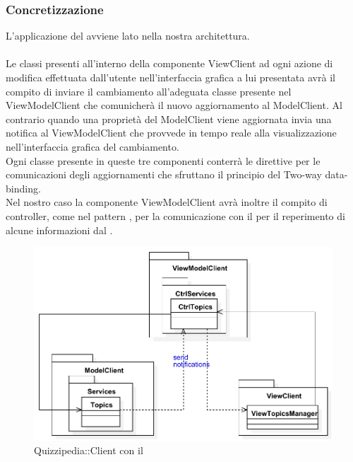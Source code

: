 \documentclass[a4paper, titlepage]{article}
\begin{document}
\subsubsection{Concretizzazione}
L'applicazione del   avviene lato  nella nostra architettura.
\\
\\ Le classi presenti all'interno della componente ViewClient ad ogni azione di modifica effettuata dall'utente nell'interfaccia grafica a lui presentata avrà il compito di inviare il cambiamento all'adeguata classe presente nel ViewModelClient che comunicherà il nuovo aggiornamento al ModelClient. Al contrario quando una proprietà del ModelClient viene aggiornata invia una notifica al ViewModelClient che provvede in tempo reale alla visualizzazione nell'interfaccia grafica del cambiamento.
\\ Ogni classe presente in queste tre componenti conterrà le direttive  per le comunicazioni degli aggiornamenti che sfruttano il principio del Two-way data-binding.
\\ Nel nostro caso la componente ViewModelClient avrà inoltre il compito di controller, come nel pattern , per la comunicazione con il  per il reperimento di alcune informazioni dal .
\begin{figure}[htp]
\centering
\includegraphics[scale=0.75]{Img/MVVM.pdf}
\caption{Quizzipedia::Client con il }
\label{}
\end{figure}
\end{document}
